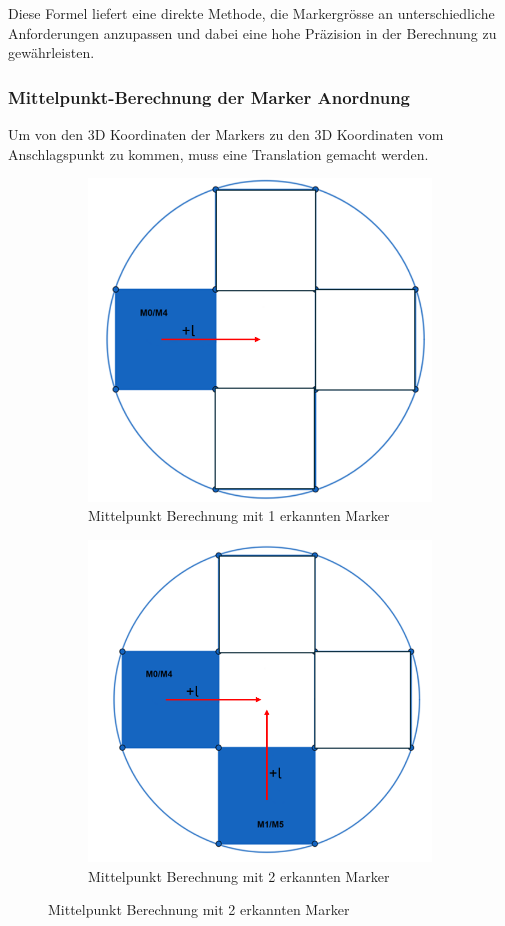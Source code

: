Diese Formel liefert eine direkte Methode, die Markergrösse an unterschiedliche Anforderungen anzupassen und dabei eine hohe Präzision in der Berechnung zu gewährleisten.


\subsubsection{Mittelpunkt-Berechnung der Marker Anordnung}
\label{sec:middlePoint}

Um von den 3D Koordinaten der Markers zu den 3D Koordinaten vom Anschlagspunkt zu kommen, muss eine Translation 
gemacht werden.

\begin{figure}[H]
    \centering
    \begin{subfigure}[h]{0.5\textwidth}
        \includegraphics[width=0.5\linewidth]{graphics/anordnung_marker_1.png}
        \caption{Mittelpunkt Berechnung mit 1 erkannten Marker}
        \label{fig:marker_anordnung1}
    \end{subfigure}
    \begin{subfigure}[h]{0.5\textwidth}
        \includegraphics[width=0.5\linewidth]{graphics/anordnung_marker_2.png}
        \caption{Mittelpunkt Berechnung mit 2 erkannten Marker}
        \label{fig:marker_anordnung2}
    \end{subfigure}

\end{figure}
